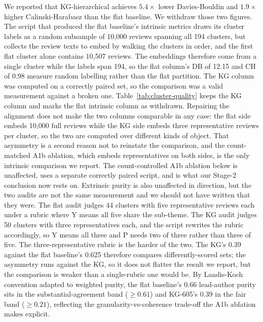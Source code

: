 \documentclass[sigconf, anonymous]{acmart}
\begin{document}
We reported that KG-hierarchical achieves $5.4\times$ lower Davies-Bouldin and $1.9\times$
  higher Calinski-Harabasz than the flat baseline. We withdraw those two figures. The script that
  produced the flat baseline's intrinsic metrics draws its cluster labels as a random subsample of
  10{,}000 reviews spanning all 194 clusters, but collects the review texts to embed by walking
  the clusters in order, and the first flat cluster alone contains 10{,}507 reviews. The
  embeddings therefore come from a single cluster while the labels span 194, so the flat column's
  DB of 12.15 and CH of 0.98 measure random labelling rather than the flat partition. The KG
  column was computed on a correctly paired set, so the comparison was a valid measurement against
  a broken one. Table~\ref{tab:cluster-quality} keeps the KG column and marks the flat intrinsic
  column as withdrawn. Repairing the alignment does not make the two columns comparable in any
  case: the flat side embeds 10{,}000 full reviews while the KG side embeds three representative
  reviews per cluster, so the two are computed over different kinds of object. That asymmetry is
  a second reason not to reinstate the comparison, and the count-matched A1b ablation, which
  embeds representatives on both sides, is the only intrinsic comparison we report. The count-controlled A1b ablation below is unaffected, uses a separate
  correctly paired script, and is what our Stage-2 conclusion now rests on. Extrinsic purity is
  also unaffected in direction, but the two audits are not the same measurement and we should not
  have written that they were. The flat audit judges 44 clusters with five representative reviews
  each under a rubric where Y means all five share the sub-theme. The KG audit judges 50 clusters
  with three representatives each, and the script rewrites the rubric accordingly, so Y means all
  three and P needs two of three rather than three of five. The three-representative rubric is the
  harder of the two. The KG's 0.39 against the flat baseline's 0.625 therefore compares
  differently-scored sets; the asymmetry runs against the KG, so it does not flatter the result we
  report, but the comparison is weaker than a single-rubric one would be. By Landis-Koch~\cite{landis1977measurement} convention adapted to weighted purity, the flat baseline's
  0.66 lead-author purity sits in the substantial-agreement band ($\geq 0.61$) and KG-605's 0.39
   in the fair band ($\geq 0.21$), reflecting the granularity-vs-coherence trade-off the A1b
  ablation makes explicit.
\end{document}
